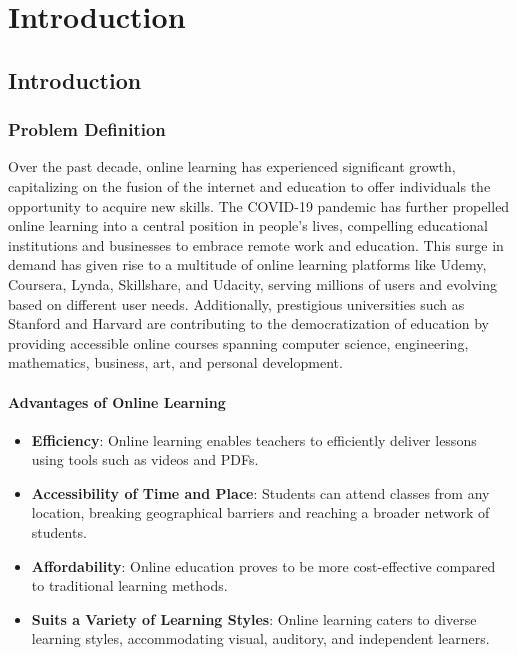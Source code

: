 
\chapter{Introduction}

\section{Introduction}


\subsection{Problem Definition}

Over the past decade, online learning has experienced significant growth, capitalizing on the fusion of the internet and education to offer individuals the opportunity to acquire new skills. The COVID-19 pandemic has further propelled online learning into a central position in people's lives, compelling educational institutions and businesses to embrace remote work and education. This surge in demand has given rise to a multitude of online learning platforms like Udemy, Coursera, Lynda, Skillshare, and Udacity, serving millions of users and evolving based on different user needs. Additionally, prestigious universities such as Stanford and Harvard are contributing to the democratization of education by providing accessible online courses spanning computer science, engineering, mathematics, business, art, and personal development.

\subsubsection*{Advantages of Online Learning}

\begin{itemize}[label=--]
	\item \textbf{Efficiency}: Online learning enables teachers to efficiently deliver lessons using tools such as videos and PDFs.
	\item \textbf{Accessibility of Time and Place}: Students can attend classes from any location, breaking geographical barriers and reaching a broader network of students.
	\item \textbf{Affordability}: Online education proves to be more cost-effective compared to traditional learning methods.
	\item \textbf{Suits a Variety of Learning Styles}: Online learning caters to diverse learning styles, accommodating visual, auditory, and independent learners.
\end{itemize}

